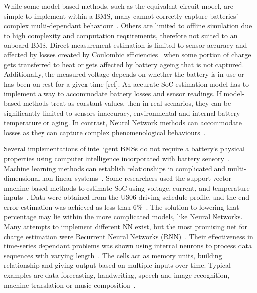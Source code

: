 %
%
While some model-based methods, such as the equivalent circuit model, are simple to implement within a BMS, many cannot correctly capture batteries' complex multi-dependant behaviour~\cite{6953745}.
Others are limited to offline simulation due to high complexity and computation requirements, therefore not suited to an onboard BMS.
Direct measurement estimation is limited to sensor accuracy and affected by losses created by Coulombic efficiencies~\cite{Smith_2010} when some portion of charge gets transferred to heat or gets affected by battery ageing that is not captured.
Additionally, the measured voltage depends on whether the battery is in use or has been on rest for a given time [ref].
An accurate SoC estimation model has to implement a way to accommodate battery losses and sensor readings.
If model-based methods treat as constant values, then in real scenarios, they can be significantly limited to sensors inaccuracy, environmental and internal battery temperature or aging.
In contrast, Neural Network methods can accommodate losses as they can capture complex phenomenological behaviours~\cite{bengio_learning_1994}.

%
%
Several implementations of intelligent BMSs do not require a battery's physical properties using computer intelligence incorporated with battery sensory~\cite{zhang_deep_2020}.
Machine learning methods can establish relationships in complicated and multi-dimensional non-linear systems~\cite{hansen_support_2005,anton_battery_2013,he_state_2014}.
Some researchers used the support vector machine-based methods to estimate SoC using voltage, current, and temperature inputs~\cite{hansen_support_2005,anton_battery_2013}.
Data were obtained from the US06 driving schedule profile, and the end error estimation was achieved as less than 6\%~\cite{he_state_2014}.
The solution to lowering that percentage may lie within the more complicated models, like Neural Networks.
Many attempts to implement different NN exist, but the most promising net for charge estimation were Recurrent Neural Networks (RNN)~\cite{song_lithium-ion_2018,Chemali2017,mamo_long_2020,jiao_gru-rnn_2020,xiao_accurate_2019,javid_adaptive_2020,zhang_deep_2020}.
Their effectiveness in time-series dependant problems was shown using internal neurons to process data sequences with varying length~\cite{Chemali2017}.
The cells act as memory units, building relationship and giving output based on multiple inputs over time.
Typical examples are data forecasting, handwriting, speech and image recognition, machine translation or music composition~\cite{devdarshan_applications_2019}. 

